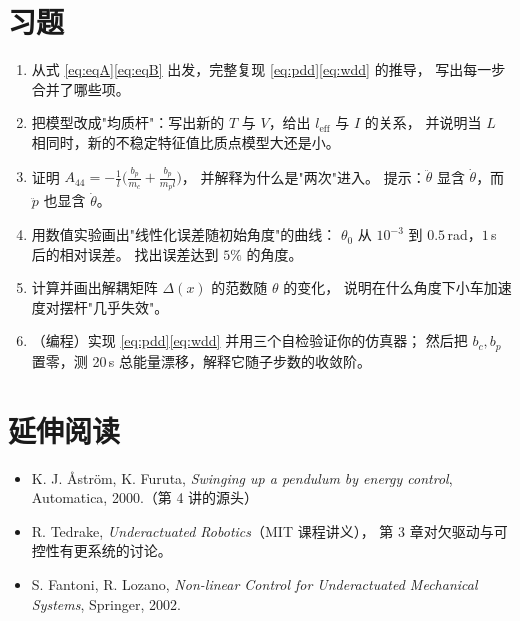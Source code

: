 \section*{习题}

\begin{enumerate}[leftmargin=2em,itemsep=6pt]
  \item 从式 \eqref{eq:eqA}\eqref{eq:eqB} 出发，完整复现 \eqref{eq:pdd}\eqref{eq:wdd} 的推导，
        写出每一步合并了哪些项。
  \item 把模型改成"均质杆"：写出新的 $T$ 与 $V$，给出 $l_{\mathrm{eff}}$ 与 $I$ 的关系，
        并说明当 $L$ 相同时，新的不稳定特征值比质点模型大还是小。
  \item 证明 $A_{44}=-\frac{1}{l}\big(\frac{b_p}{m_c}+\frac{b_p}{m_p l}\big)$，
        并解释为什么是"两次"进入。
        提示：$\ddot\theta$ 显含 $\dot\theta$，而 $\ddot p$ 也显含 $\dot\theta$。
  \item 用数值实验画出"线性化误差随初始角度"的曲线：
        $\theta_0$ 从 $10^{-3}$ 到 $0.5$\,rad，$1$\,s 后的相对误差。
        找出误差达到 $5\%$ 的角度。
  \item 计算并画出解耦矩阵 $\Delta(x)$ 的范数随 $\theta$ 的变化，
        说明在什么角度下小车加速度对摆杆"几乎失效"。
  \item （编程）实现 \eqref{eq:pdd}\eqref{eq:wdd} 并用三个自检验证你的仿真器；
        然后把 $b_c,b_p$ 置零，测 20\,s 总能量漂移，解释它随子步数的收敛阶。
\end{enumerate}

\section*{延伸阅读}
\begin{itemize}[leftmargin=2em,itemsep=2pt]
  \item K. J. Åström, K. Furuta, \emph{Swinging up a pendulum by energy control},
        Automatica, 2000.（第 4 讲的源头）
  \item R. Tedrake, \emph{Underactuated Robotics}（MIT 课程讲义），
        第 3 章对欠驱动与可控性有更系统的讨论。
  \item S. Fantoni, R. Lozano, \emph{Non-linear Control for Underactuated Mechanical
        Systems}, Springer, 2002.
\end{itemize}
